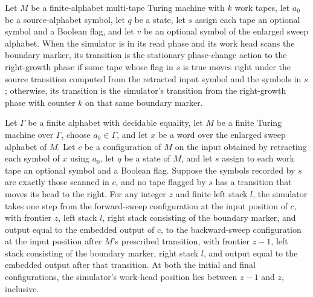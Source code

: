 \begin{lemma}
\label{Turing.FinTM.dg_read_boundary}
\leanok
{}
Let $M$ be a finite-alphabet multi-tape Turing machine with $k$ work tapes, let $a_0$ be
a source-alphabet symbol, let $q$ be a state, let $s$ assign each tape an optional
symbol and a Boolean flag, and let $v$ be an optional symbol of the enlarged sweep
alphabet. When the simulator is in its read phase and its work head scans the boundary
marker, its transition is the stationary phase-change action to the right-growth phase
if some tape whose flag in $s$ is true moves right under the source transition computed
from the retracted input symbol and the symbols in $s$; otherwise, its transition is the
simulator's transition from the right-growth phase with counter $k$ on that same
boundary marker.
\end{lemma}

\begin{lemma}
\label{Turing.FinTM.dg_turn_without_growth}
\leanok
{}
Let $\Gamma$ be a finite alphabet with decidable equality, let $M$ be a finite Turing
machine over $\Gamma$, choose $a_0\in\Gamma$, and let $x$ be a word over the enlarged
sweep alphabet of $M$. Let $c$ be a configuration of $M$ on the input obtained by
retracting each symbol of $x$ using $a_0$, let $q$ be a state of $M$, and let $s$ assign
to each work tape an optional symbol and a Boolean flag. Suppose the symbols recorded by
$s$ are exactly those scanned in $c$, and no tape flagged by $s$ has a transition that
moves its head to the right. For any integer $z$ and finite left stack $l$, the
simulator takes one step from the forward-sweep configuration at the input position of
$c$, with frontier $z$, left stack $l$, right stack consisting of the boundary marker,
and output equal to the embedded output of $c$, to the backward-sweep configuration at
the input position after $M$'s prescribed transition, with frontier $z-1$, left stack
consisting of the boundary marker, right stack $l$, and output equal to the embedded
output after that transition. At both the initial and final configurations, the
simulator's work-head position lies between $z-1$ and $z$, inclusive.
\end{lemma}

